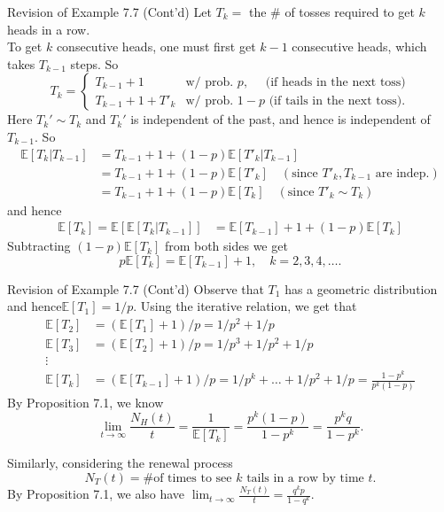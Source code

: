 \documentclass[letterpaper,handout]{beamer}
\def\E{\mathbb E}
\begin{document}
\begin{frame}{Revision of Example 7.7 (Cont'd)}
Let $T_k=$  the \# of tosses required to get $k$ heads in a row.\\
To get $k$ consecutive heads, one must first get $k-1$ consecutive heads, which takes $T_{k-1}$ steps.
So
$$
T_k=
\begin{cases}
T_{k-1}+1 &\mbox{w/ prob. } p, \quad\text{ (if heads in the next toss)}\\
T_{k-1}+1+T'_k   &\mbox{w/ prob. } 1-p \text{ (if tails in the next toss)}.
\end{cases}
$$
Here $T_k'\sim T_k$ and $T_k'$ is independent of the past, and hence is independent of $T_{k-1}.$
So
\begin{align*}
\E[T_k|T_{k-1}]
&=T_{k-1}+1+(1-p)\E[T'_k|T_{k-1}]\\
&=T_{k-1}+1+(1-p)\E[T'_k]\quad(\text{since $T'_k, T_{k-1}$ are indep.})\\
&=T_{k-1}+1+(1-p)\E[T_k]\quad(\text{since $T'_k\sim T_k$})
\end{align*}
and hence
\begin{align*}
\E[T_k]=\E[\E[T_k|T_{k-1}]]&=\E[T_{k-1}]+1+(1-p)\E[T_k]
\end{align*}
Subtracting $(1-p)\E[T_k]$ from both sides we get
$$p\E[T_k] = \E[T_{k-1}] + 1,\quad k=2, 3, 4, \ldots.$$
\end{frame}
\begin{frame}{Revision of Example 7.7 (Cont'd)}
Observe that $T_1$ has a geometric distribution and hence$\E[T_1]=1/p.$
Using the iterative relation, we get that
\begin{align*}
\E[T_2]&=(\E[T_1] + 1)/p=1/p^2+1/p\\
\E[T_3]&=(\E[T_2] + 1)/p=1/p^3+1/p^2+1/p\\[-3pt]
\vdots\\[-8pt]
\E[T_k]&=(\E[T_{k-1}] + 1)/p=1/p^k+\ldots+1/p^2+1/p=\frac{1-p^k}{p^k(1-p)}
\end{align*}
By Proposition 7.1, we know
$$\lim_{t\to\infty}\frac{N_H(t)}{t}=\frac{1}{\E[T_k]}=\frac{p^k(1-p)}{1-p^k}=\frac{p^kq}{1-p^k}.$$

Similarly, considering the renewal process
$$N_T(t)=\mbox{\# of times to see $k$ tails in a row by time }t.$$
By Proposition 7.1, we also have
$\displaystyle\lim_{t\to\infty}\frac{N_T(t)}{t}=\frac{q^kp}{1-q^k}.$
\end{frame}
\end{document}
